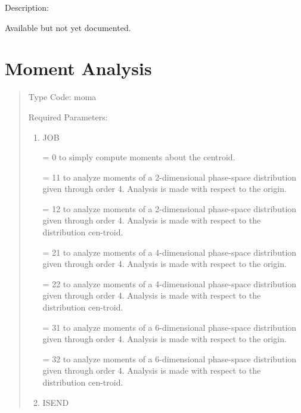 \vspace{5mm}
Description:
\vspace{2mm}

Available but not yet documented.

\newpage
\section{Moment Analysis} 
\begin{quotation}
\noindent Type Code:  moma
\vspace{5mm}

\noindent Required Parameters:
\begin{enumerate}
\item  JOB

      = 0 to simply compute moments about the centroid.

     = 11 to analyze moments of a 2-dimensional phase-space distribution
	   given \hspace*{1em}through order 4.  Analysis is made with respect to
	   the origin.

	    = 12 to analyze moments of a 2-dimensional phase-space distribution
	   given \hspace*{1em}through order 4.  Analysis is made with respect to
	   the distribution cen-\hspace*{1em}troid.

       = 21 to analyze moments of a 4-dimensional phase-space distribution
	   given \hspace*{1em}through order 4.  Analysis is made with respect to
	   the origin.

	   = 22 to analyze moments of a 4-dimensional phase-space distribution
	   given \hspace*{1em}through order 4.  Analysis is made with respect to
	   the distribution cen-\hspace*{1em}troid.

       = 31 to analyze moments of a 6-dimensional phase-space distribution
	   given \hspace*{1em}through order 4.  Analysis is made with respect to
	   the origin.

	    = 32 to analyze moments of a 6-dimensional phase-space distribution
	   given \hspace*{1em}through order 4.  Analysis is made with respect to
	   the distribution cen-\hspace*{1em}troid.

\item   ISEND


\end{enumerate}
\end{quotation}
